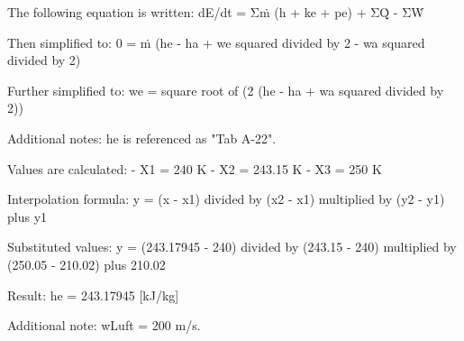 The following equation is written:  
dE/dt = Σṁ (h + ke + pe) + ΣQ̇ - ΣẆ  

Then simplified to:  
0 = ṁ (he - ha + we squared divided by 2 - wa squared divided by 2)  

Further simplified to:  
we = square root of (2 (he - ha + wa squared divided by 2))  

Additional notes:  
he is referenced as "Tab A-22".  

Values are calculated:  
- X1 = 240 K  
- X2 = 243.15 K  
- X3 = 250 K  

Interpolation formula:  
y = (x - x1) divided by (x2 - x1) multiplied by (y2 - y1) plus y1  

Substituted values:  
y = (243.17945 - 240) divided by (243.15 - 240) multiplied by (250.05 - 210.02) plus 210.02  

Result:  
he = 243.17945 [kJ/kg]  

Additional note:  
wLuft = 200 m/s.